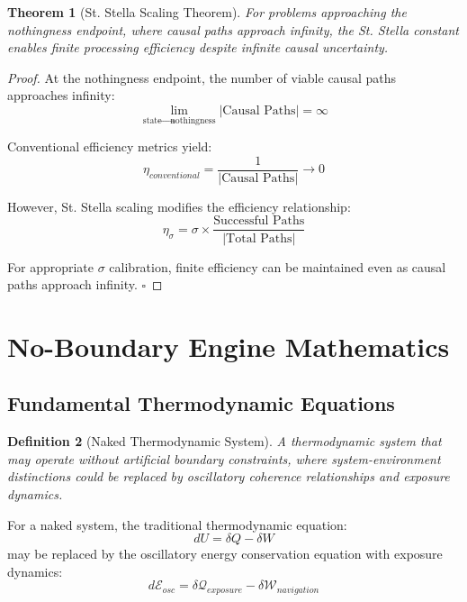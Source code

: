 \documentclass[11pt,a4paper]{article}
\newtheorem{theorem}{Theorem}[section]
\newtheorem{definition}[theorem]{Definition}
\theoremstyle{remark}
\begin{document}
\begin{theorem}[St. Stella Scaling Theorem]
For problems approaching the nothingness endpoint, where causal paths approach infinity, the St. Stella constant enables finite processing efficiency despite infinite causal uncertainty.
\end{theorem}

\begin{proof}
At the nothingness endpoint, the number of viable causal paths approaches infinity:
\begin{equation}
\lim_{\text{state} \to \text{nothingness}} |\text{Causal Paths}| = \infty
\end{equation}

Conventional efficiency metrics yield:
\begin{equation}
\eta_{conventional} = \frac{1}{|\text{Causal Paths}|} \to 0
\end{equation}

However, St. Stella scaling modifies the efficiency relationship:
\begin{equation}
\eta_{\sigma} = \sigma \times \frac{\text{Successful Paths}}{|\text{Total Paths}|}
\label{eq:stella_efficiency_modified}
\end{equation}

For appropriate $\sigma$ calibration, finite efficiency can be maintained even as causal paths approach infinity. $\square$
\end{proof}

\section{No-Boundary Engine Mathematics}

\subsection{Fundamental Thermodynamic Equations}

\begin{definition}[Naked Thermodynamic System]
A thermodynamic system that may operate without artificial boundary constraints, where system-environment distinctions could be replaced by oscillatory coherence relationships and exposure dynamics.
\end{definition}

For a naked system, the traditional thermodynamic equation:
\begin{equation}
dU = \delta Q - \delta W
\end{equation}
may be replaced by the oscillatory energy conservation equation with exposure dynamics:
\begin{equation}
d\mathcal{E}_{osc} = \delta \mathcal{Q}_{exposure} - \delta \mathcal{W}_{navigation}
\label{eq:naked_energy}
\end{equation}
\end{document}
